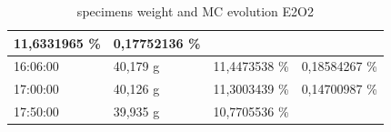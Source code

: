 \begin{table}[h]
\begin{tabular}{llll}
		\multicolumn{1}{l|}{11,6331965   \%} &
		\multicolumn{1}{l|}{0,17752136 \%} \\ \hline
		\multicolumn{1}{|l|}{16:06:00} &
		\multicolumn{1}{l|}{40,179 g} &
		\multicolumn{1}{l|}{11,4473538   \%} &
		\multicolumn{1}{l|}{0,18584267 \%} \\ \hline
		\multicolumn{1}{|l|}{17:00:00} &
		\multicolumn{1}{l|}{40,126 g} &
		\multicolumn{1}{l|}{11,3003439   \%} &
		\multicolumn{1}{l|}{0,14700987 \%} \\ \hline
		\multicolumn{1}{|l|}{17:50:00} &
		\multicolumn{1}{l|}{39,935 g} &
		\multicolumn{1}{l|}{10,7705536   \%} &
		\\ \cline{1-3}
	\end{tabular}
	\caption{specimens weight and MC evolution E2O2}
	\label{tab:Tab5}
\end{table}

